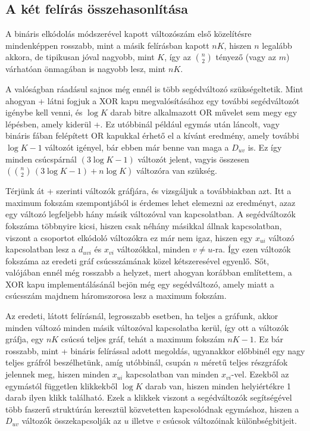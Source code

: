 \subsection{A két felírás összehasonlítása}\label{sec:theoryonehotVSbinary}

A bináris elkódolás módszerével kapott változószám első közelítésre mindenképpen rosszabb, mint a másik felírásban kapott $nK$, hiszen $n$ legalább akkora, de tipikusan jóval nagyobb, mint $K$, így az $\binom{n}{2}$ tényező (vagy az $m$) várhatóan önmagában is nagyobb lesz, mint $nK$.

A valóságban ráadásul sajnos még ennél is több segédváltozó szükségeltetik. Mint ahogyan 
\az+ látni fogjuk a XOR kapu megvalósításához egy további segédváltozót igénybe kell venni, és $\log K$ darab bitre alkalmazott OR művelet sem megy egy lépésben, amely kiderül \az+. Ez utóbbinál például egymás után láncolt, vagy bináris fában felépített OR kapukkal érhető el a kívánt eredmény, amely további $\log K -1$ változót igényel, bár ebben már benne van maga a $D_{uv}$ is. Ez így minden csúcspárnál $(3\log K - 1)$ változót jelent, vagyis összesen $\left(\binom{n}{2} \, (3\log K -  1 ) + n \log K\right)$ változóra van szükség.
 
Térjünk át \az+ szerinti változók gráfjára, és vizsgáljuk a továbbiakban azt.
Itt a maximum fokszám szempontjából is érdemes lehet elemezni az eredményt, azaz egy változó legfeljebb hány másik változóval van kapcsolatban. A segédváltozók fokszáma többnyire kicsi, hiszen csak néhány másikkal állnak kapcsolatban, viszont a csoportot elkódoló változókra ez már nem igaz, hiszen egy $x_{ui}$ változó kapcsolatban lesz a $d_{uvi}$ és $x_{vi}$ változókkal, minden $v \neq u$-ra. Így ezen változók fokszáma az eredeti gráf csúcsszámának közel kétszeresével egyenlő. Sőt, valójában ennél még rosszabb a helyzet, mert ahogyan korábban említettem, a XOR kapu implementálásánál bejön még egy segédváltozó, amely miatt a csúcsszám majdnem háromszorosa lesz a maximum fokszám.

 
Az eredeti,  látott felírásnál, legrosszabb esetben, ha teljes a gráfunk, akkor minden változó minden másik változóval kapcsolatba kerül, így ott a változók gráfja, egy $nK$ csúcsú teljes gráf, tehát a maximum fokszám  $nK -1$. Ez bár rosszabb, mint \az+ bináris felírással adott megoldás, ugyanakkor előbbinél egy nagy teljes gráfról beszélhetünk, amíg utóbbinál, csupán $n$ méretű teljes részgráfok jelennek meg, hiszen minden $x_{ui}$ kapcsolatban van minden $x_{vi}$-vel. Ezekből az egymástól független klikkekből $\log K$ darab van, hiszen minden helyiértékre 1 darab ilyen klikk található. Ezek a klikkek viszont a segédváltozók segítségével több faszerű struktúrán keresztül közvetetten kapcsolódnak egymáshoz, hiszen a $D_{uv}$ változók összekapcsolják az $u$ illetve $v$ csúcsok változóinak különbségbitjeit.


